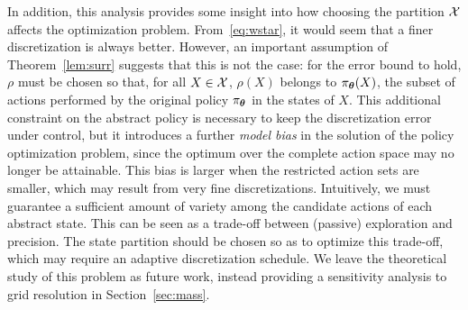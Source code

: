 In addition, this analysis provides some insight into how choosing the partition $\mathcal{X}$ affects the optimization problem. From~\eqref{eq:wstar}, it would seem that a finer discretization is always better. However, an important assumption of Theorem~\ref{lem:surr} suggests that this is not the case: for the error bound to hold, $\rho$ must be chosen so that, for all $X\in\mathcal{X}$, $\rho(X)$ belongs to $\pi_{\boldsymbol{\theta}}(X)$, the subset of actions performed by the original policy $\pi_{\boldsymbol{\theta}}$ in the states of $X$. This additional constraint on the abstract policy is necessary to keep the discretization error under control, but it introduces a further \textit{model bias} in the solution of the policy optimization problem, since the optimum over the complete action space may no longer be attainable. This bias is larger when the restricted action sets are smaller, which may result from very fine discretizations. 
%
Intuitively, we must guarantee a sufficient amount of variety among the candidate actions of each abstract state. This can be seen as a trade-off between (passive) exploration and precision. The state partition should be chosen so as to optimize this trade-off, which may require an adaptive discretization schedule. We leave the theoretical study of this problem as future work, instead providing a sensitivity analysis to grid resolution in Section~\ref{sec:mass}.


